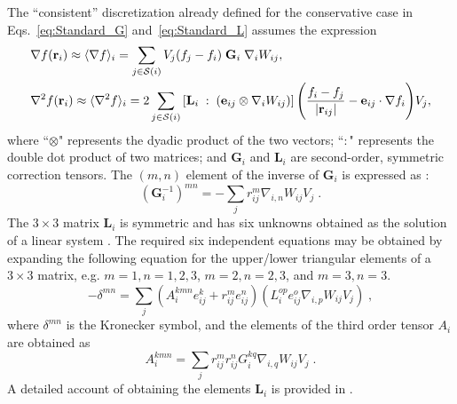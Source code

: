 \noindent The ``consistent'' discretization already defined for the conservative case in Eqs.~\ref{eq:Standard_G} and~\ref{eq:Standard_L} assumes the expression \cite{fatehi2011,randles1996}
\begin{align}
&\nabla f(\mathbf r_i) \approx \langle \nabla f \rangle_i=\sum_{j \in {{\mathcal{S}({i})}}} V_j (f_j-f_i)\; \mathbf{G}_i\; \nabla_i W_{ij},\label{eq:Consistent_G}\\
&\nabla^2 f(\mathbf r_i) \approx \langle \nabla^2 f \rangle_i=2\sum_{j \in {{\mathcal{S}({i})}}}  \left[ \mathbf{L}_i \;:\;  (\mathbf{e}_{ij} \otimes \nabla_i W_{ij}) \right] \Bigg( \frac{f_i-f_j}{|\mathbf{r}_{ij}|}  - \mathbf{e}_{ij} \cdot \nabla f_i\Bigg) V_j,\label{eq:Consistent_L}
\end{align}
where ``$\otimes$" represents the dyadic product of the two vectors; ``$:$" represents the double dot product of two matrices; and $\mathbf{G}_i$ and $\mathbf{L}_i$ are  second-order, symmetric correction tensors. The  $(m,n)$ element of the inverse of $\mathbf{G}_{i}$ is expressed as \cite{Libersky1993,randles1996,fatehi2011}: 
\begin{equation}\label{eq:gradient_Gi}
(\textbf{G}_{i}^{-1})^{mn}=-\sum\limits_j r_{ij}^{m}\nabla_{i,n}W_{ij}V_{j} \;.
\end{equation}
\noindent The $3 \times 3$ matrix $\mathbf{L}_i$ is symmetric and has six unknowns obtained as the solution of a linear system \cite{fatehi2011}. The required six independent equations may be obtained by expanding the following equation for the upper/lower triangular elements of a $3 \times 3 $ matrix, e.g. $m=1,n=1,2,3$,   $m=2,n=2,3$, and $m=3,n=3$.
\begin{equation}\label{eq:delta_mn}
-\delta^{mn}=\sum\limits_j(A_{i}^{kmn}e_{ij}^{k}+r_{ij}^{m}e_{ij}^{n})(L_{i}^{op}e_{ij}^{o}\nabla_{i,p}W_{ij}V_{j}) \; ,
\end{equation}
where $\delta^{mn}$ is the Kronecker symbol, and the elements of the third order tensor $A_{i}$ are obtained as 
\begin{equation}\label{equ:Ai_kmn}
A_{i}^{kmn}=\sum\limits_j r_{ij}^{m} r_{ij}^{n}G_{i}^{kq}\nabla_{i,q}W_{ij}V_{j} \;.
\end{equation}
A detailed account of obtaining the elements $\textbf{L}_i$ is provided in \cite{TR-2016-14}. 

